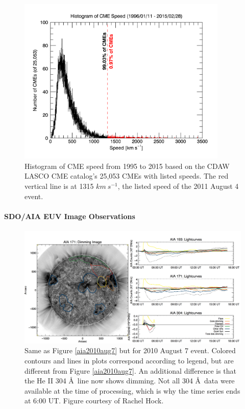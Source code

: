\begin{figure}[!h]
    \begin{center}
	    \includegraphics[width=100mm]{Images/HistoricalCmeVelocity.png}
    \end{center}
    \caption[Historical CME speed histogram]{
        Histogram of CME speed from 1995 to 2015 based on the CDAW LASCO CME catalog's 25,053 CMEs with listed speeds. 
        The red vertical line is at 1315 $km\ s^{-1}$, the listed speed of the 2011 August 4 event. 
	}
    \label{fig:cmespeeds1315}
\end{figure}


\paragraph{SDO/AIA EUV Image Observations}

\begin{figure}[!h]
    \begin{center}
	    \includegraphics[width=166mm]{Images/Aia2011Aug4.png}
    \end{center}
    \caption[AIA contour analysis for 2011 August 4 event]{
        Same as Figure \ref{aia2010aug7} but for 2010 August 7 event. Colored contours and lines in plots correspond 
        according to legend, but are different from Figure \ref{aia2010aug7}. An additional difference is that the He II
        304 \AA\ line now shows dimming. Not all 304 \AA\ data were available at the time of processing, which is why the 
        time series ends at 6:00 UT. Figure courtesy of Rachel Hock. 
	}
    \label{aia2011aug4}
\end{figure}


